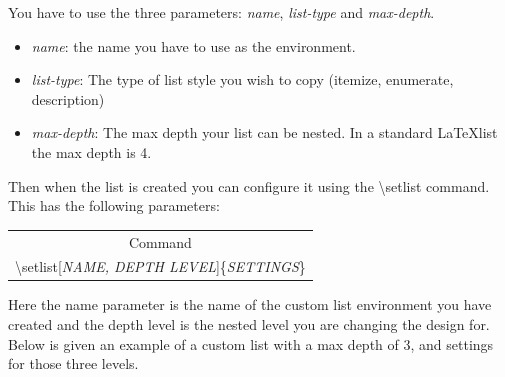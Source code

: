 \documentclass{article}
\newcommand{\jbs}[1]{\textbackslash{}#1} %
\begin{document}
You have to use the three parameters: \textit{name}, \textit{list-type} and \textit{max-depth}.
\begin{itemize}
    \item \textit{name}: the name you have to use as the environment.
    \item \textit{list-type}: The type of list style you wish to copy (itemize, enumerate, description)
    \item \textit{max-depth}: The max depth your list can be nested. In a standard \LaTeX list the max depth is 4.
\end{itemize}

Then when the list is created you can configure it using the \jbs{setlist} command. This has the following parameters:

\begin{table} [H]
    \centering\begin{tabular}{|c|} \hline
        \rowcolor{gray!30}
        Command \\
        \jbs{setlist[\textit{NAME, DEPTH LEVEL}]\{\textit{SETTINGS}\}} \\ \hline
    \end{tabular}
\end{table} %

Here the name parameter is the name of the custom list environment you have created and the depth level is the nested level you are changing the design for.
Below is given an example of a custom list with a max depth of 3, and settings for those three levels.
\end{document}
